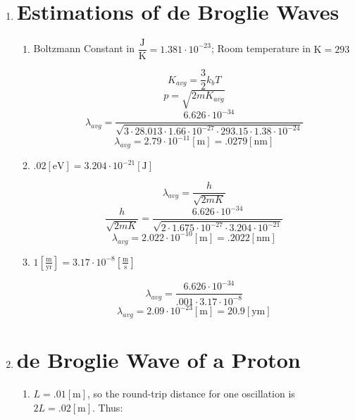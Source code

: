 \begin{enumerate}

  \item 
    
    \section*{Estimations of de Broglie Waves}

    \begin{enumerate}

      \item Boltzmann Constant in $\dfrac{\si{\joule}}{\si{\kelvin}}=1.381\cdot10^{-23}$; Room temperature in $\si{\kelvin}=293$

        $$K_{avg}=\frac{3}{2}k_bT$$
        $$p=\sqrt{2mK_{avg}}$$
        $$\lambda_{avg}=\frac{6.626\cdot10^{-34}}{\sqrt{3\cdot28.013\cdot1.66\cdot10^{-27}\cdot293.15\cdot1.38\cdot10^{-24}}}$$
        $$\lambda_{avg}=2.79\cdot10^{-11}[\si{\meter}]=.0279[\si{\nano\meter}]$$

      \item $.02[\si{\eV}]=3.204\cdot10^{-21}[\si{\joule}]$

        $$\lambda_{avg}=\frac{h}{\sqrt{2mK}}$$
        $$\frac{h}{\sqrt{2mK}}=\frac{6.626\cdot10^{-34}}{\sqrt{2\cdot1.675\cdot10^{-27}\cdot3.204\cdot10^{-21}}}$$
        $$\lambda_{avg}=2.022\cdot10^{-10}[\si{\meter}]=.2022[\si{\nano\meter}]$$

      \item $1\left[ \frac{\si{\meter}}{\text{yr}} \right]=3.17\cdot10^{-8}\left[ \frac{\si{\meter}}{\si{\second}} \right]$

        $$\lambda_{avg}=\frac{6.626\cdot10^{-34}}{.001\cdot3.17\cdot10^{-8}}$$
        $$\lambda_{avg}=2.09\cdot10^{-23}[\si{\meter}]=20.9[\si{\yocto\meter}]$$

    \end{enumerate}

  \item

    \section*{de Broglie Wave of a Proton}

    \begin{enumerate}

      \item $L=.01[\si{\meter}]$, so the round-trip distance for one oscillation is $2L=.02[\si{\meter}]$. Thus:


\end{enumerate}
\end{enumerate}
